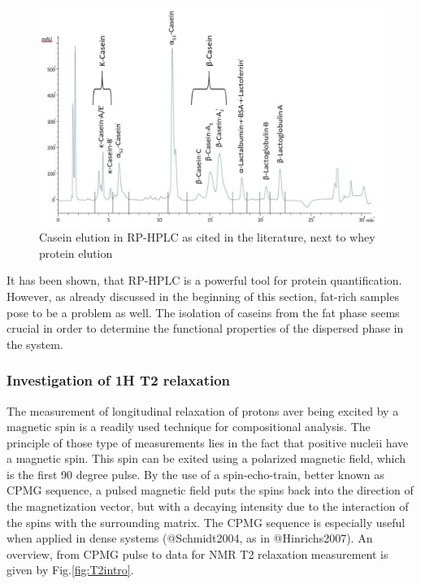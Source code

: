 \documentclass[
]{article}
\begin{document}
\begin{figure}
\centering
\includegraphics{images/elution_casein.jpg}
\caption{Casein elution in RP-HPLC as cited in the literature, next to
whey protein elution}
\end{figure}

It has been shown, that RP-HPLC is a powerful tool for protein
quantification. However, as already discussed in the beginning of this
section, fat-rich samples pose to be a problem as well. The isolation of
caseins from the fat phase seems crucial in order to determine the
functional properties of the dispersed phase in the system.

\subsubsection{Investigation of 1H T2 relaxation}

The measurement of longitudinal relaxation of protons aver being excited
by a magnetic spin is a readily used technique for compositional
analysis. The principle of those type of measurements lies in the fact
that positive nucleii have a magnetic spin. This spin can be exited
using a polarized magnetic field, which is the first 90 degree pulse. By
the use of a spin-echo-train, better known as CPMG sequence, a pulsed
magnetic field puts the spins back into the direction of the
magnetization vector, but with a decaying intensity due to the
interaction of the spins with the surrounding matrix. The CPMG sequence
is especially useful when applied in dense systems (@Schmidt2004, as in
@Hinrichs2007). An overview, from CPMG pulse to data for NMR T2
relaxation measurement is given by Fig.\ref{fig:T2intro}.
\end{document}
